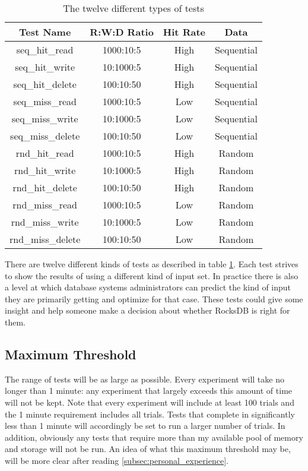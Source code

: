\documentclass[twocolumn,11pt]{article}
\begin{document}
\begin{table}[h!]
  \begin{tabular}{ |c|c|c|c| }
    \hline
    Test Name & R:W:D Ratio & Hit Rate & Data \\
    \hline \hline
    seq\_hit\_read & 1000:10:5 & High & Sequential \\ \hline
    seq\_hit\_write & 10:1000:5 & High & Sequential \\ \hline
    seq\_hit\_delete & 100:10:50 & High & Sequential \\ \hline
    seq\_miss\_read & 1000:10:5 & Low & Sequential \\ \hline
    seq\_miss\_write & 10:1000:5 & Low & Sequential \\ \hline
    seq\_miss\_delete & 100:10:50 & Low & Sequential \\ \hline
    rnd\_hit\_read & 1000:10:5 & High & Random \\ \hline
    rnd\_hit\_write & 10:1000:5 & High & Random \\ \hline
    rnd\_hit\_delete & 100:10:50 & High & Random \\ \hline
    rnd\_miss\_read & 1000:10:5 & Low & Random \\ \hline
    rnd\_miss\_write & 10:1000:5 & Low & Random \\ \hline
    rnd\_miss\_delete & 100:10:50 & Low & Random \\ \hline
  \end{tabular}
  \caption{The twelve different types of tests}
  \label{tab:types_of_tests}
\end{table}

There are twelve different kinds of tests as described in table
\ref{tab:types_of_tests}. Each test strives to show the results of using a
different kind of input set. In practice there is also a level at which database
systems administrators can predict the kind of input they are primarily getting
and optimize for that case. These tests could give some insight and help someone
make a decision about whether RocksDB is right for them.

\subsection{Maximum Threshold}
\label{subsec:max_threshold}

The range of tests will be as large as possible. Every experiment will take no
longer than 1 minute: any experiment that largely exceeds this amount of time
will not be kept. Note that every experiment will include at least 100 trials
and the 1 minute requirement includes all trials. Tests that complete in
significantly less than 1 minute will accordingly be set to run a larger number
of trials. In addition, obviously any tests that require more than my available
pool of memory and storage will not be run. An idea of what this maximum
threshold may be, will be more clear after reading
\ref{subsec:personal_experience}.
\end{document}
